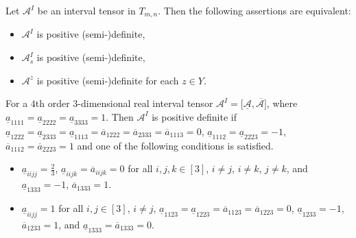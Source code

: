\documentclass[10pt,a4paper]{amsart}
\begin{document}
\begin{theorem}\label{th2}
Let $\mathcal{A}^I$ be an interval tensor in $T_{m,n}$. Then the following assertions are equivalent:
\begin{itemize}
  \item [$(a)$] $\mathcal{A}^I$ is positive (semi-)definite,
  \item [$(b)$] $\mathcal{A}^I_s$ is positive (semi-)definite,
  \item [$(c)$] $\mathcal{A}^z$ is positive (semi-)definite for each $z\in Y$.
\end{itemize}
\end{theorem}

\begin{theorem}\label{th3.4}
For a $4$th order $3$-dimensional real interval tensor ${\mathcal{A}}^I=[\underline{\mathcal{A}},\overline{\mathcal{A}]}$, where  $\underline{a}_{1111}=\underline{a}_{2222}=\underline{a}_{3333}=1$. Then ${\mathcal{A}}^I$ is positive definite if $\underline{a}_{1222}=\underline{a}_{2333}=\underline{a}_{1113}=\overline{a}_{1222}=\overline{a}_{2333}=\overline{a}_{1113}=0$, $\underline{a}_{1112}=\underline{a}_{2223}=-1$, $\overline{a}_{1112}=\overline{a}_{2223}=1$ and one of the following conditions is satisfied.
\begin{itemize}
  \item [(a)] $\underline{a}_{iijj}=\frac{2}{3}$, $\underline{a}_{iijk}=\overline{a}_{iijk}=0$ for all $i,j,k\in[3]$, $i\neq j$, $i\neq k$, $j\neq k$, and $\underline{a}_{1333}=-1$, $\overline{a}_{1333}=1$.
   \item [(b)] $\underline{a}_{iijj}=1$ for all $i,j\in[3]$, $i\neq j$, $\underline{a}_{1123}=\underline{a}_{1223}=\overline{a}_{1123}=\overline{a}_{1223}=0$, $\underline{a}_{1233}=-1$, $\overline{a}_{1233}=1$, and $\underline{a}_{1333}=\overline{a}_{1333}=0$.
 \end{itemize}
\end{theorem}
\end{document}
